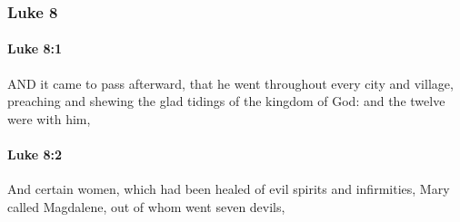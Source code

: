 	\subsubsection{Luke 8} %
		\label{LUKE-8}
		
		\paragraph{Luke 8:1} %
			\label{LUKE-8-1}

			AND it came to pass afterward, that he went throughout every city and village, preaching and shewing the glad tidings of the kingdom of God: and the twelve were with him,

			\begin{framed}
			\scriptsize
				\begin{compactdesc}
					\item[SBLG] 
				\end{compactdesc}
			\end{framed}

		\paragraph{Luke 8:2} %
			\label{LUKE-8-2}

			And certain women, which had been healed of evil spirits and infirmities, Mary called Magdalene, out of whom went seven devils,

